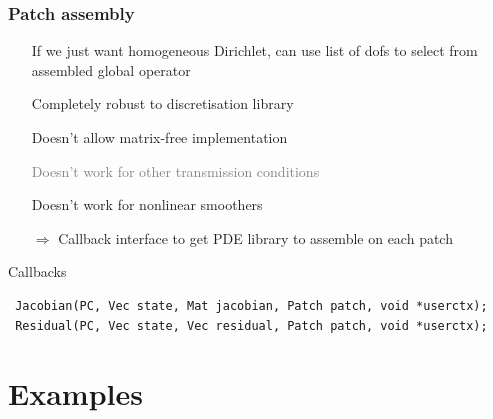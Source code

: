\documentclass[presentation,aspectratio=43, 10pt]{beamer}
\newcommand{\cmark}{\ding{51}}
\newcommand{\xmark}{\ding{55}}
\begin{document}
\begin{frame}[fragile]
  \frametitle{Patch assembly}
  \begin{itemize}
  \item[\cmark] If we just want homogeneous Dirichlet, can use list of dofs to
    select from assembled global operator
  \item[\cmark] Completely robust to discretisation library
  \item[\xmark] Doesn't allow matrix-free implementation
  \item[\textcolor{gray}{\xmark}] \textcolor{gray}{Doesn't work for other transmission conditions}
  \item[\xmark] Doesn't work for nonlinear smoothers
  \item[$\Rightarrow$] Callback interface to get PDE library to
    assemble on each patch
  \end{itemize}
  \begin{block}{Callbacks}
\begin{verbatim}
 Jacobian(PC, Vec state, Mat jacobian, Patch patch, void *userctx);
 Residual(PC, Vec state, Vec residual, Patch patch, void *userctx);
\end{verbatim}
  \end{block}
\end{frame}

\section{Examples}
\end{document}
